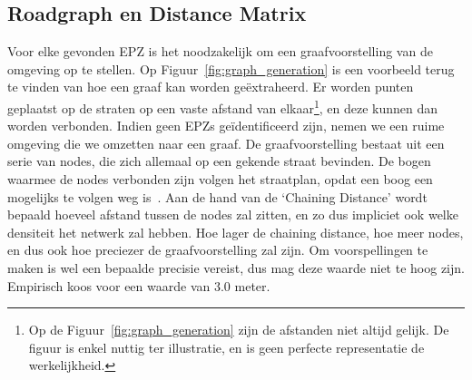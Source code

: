 \subsection{Roadgraph en Distance Matrix}\label{sec:roadgraph}
Voor elke gevonden EPZ is het noodzakelijk om een graafvoorstelling van de
omgeving op te stellen. Op Figuur~\ref{fig:graph_generation} is een voorbeeld
terug te vinden van hoe een graaf kan worden geëxtraheerd. Er worden punten
geplaatst op de straten op een vaste afstand van
elkaar\footnote{\label{fn:roadgraph}Op de Figuur~\ref{fig:graph_generation}
    zijn de afstanden niet altijd gelijk. De figuur is enkel nuttig ter
    illustratie, en is geen perfecte representatie de werkelijkheid.}, en deze
kunnen dan worden verbonden. Indien geen \acp{EPZ} geïdentificeerd zijn, nemen
we een ruime omgeving die we omzetten naar een graaf. De graafvoorstelling
bestaat uit een serie van nodes, die zich allemaal op een gekende straat
bevinden. De bogen waarmee de nodes verbonden zijn volgen het straatplan, opdat
een boog een mogelijks te volgen weg is~\cite{neira2022graph}. Aan de hand van
de `Chaining Distance' wordt bepaald hoeveel afstand tussen de nodes zal
zitten, en zo dus impliciet ook welke densiteit het netwerk zal hebben. Hoe
lager de chaining distance, hoe meer nodes, en dus ook hoe preciezer de
graafvoorstelling zal zijn. Om voorspellingen te maken is wel een bepaalde
precisie vereist, dus mag deze waarde niet te hoog zijn. Empirisch koos
\citeauthor{Dhondt} voor een waarde van $3.0$ meter.
